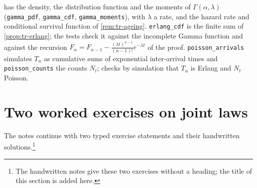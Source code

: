 \begin{remark}[computational]\label{rem:tr-gamma-code}
 has the density, the distribution function and the
moments of $\Gamma(\alpha,\lambda)$ (\texttt{gamma\_pdf}, \texttt{gamma\_cdf}, \texttt{gamma\_moments}),
with $\lambda$ a rate, and the hazard rate and conditional survival function of
\cref{rem:tr-ageing}. \texttt{erlang\_cdf} is the finite sum of \cref{prop:tr-erlang}; the tests
check it against the incomplete Gamma function and against the recursion
$F_n=F_{n-1}-\frac{(\lambda t)^{n-1}}{(n-1)!}e^{-\lambda t}$ of the proof.
\texttt{poisson\_arrivals} simulates $T_n$ as cumulative sums of exponential inter-arrival times
and \texttt{poisson\_counts} the counts $N_t$;  checks by simulation
that $T_n$ is Erlang and $N_t$ Poisson.
\end{remark}


\section{Two worked exercises on joint laws}\label{sec:tr-exercises}

The notes continue with two typed exercise statements and their handwritten
solutions.\footnote{The handwritten notes give these two exercises without a heading; the title of
this section is added here.}

